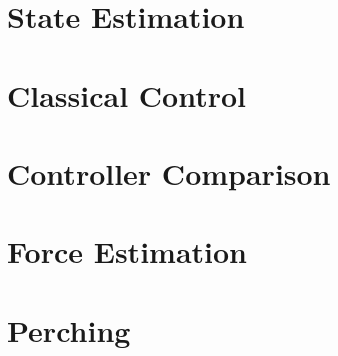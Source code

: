 \section{State Estimation}
\section{Classical Control}
\section{Controller Comparison}
\section{Force Estimation}
\section{Perching}